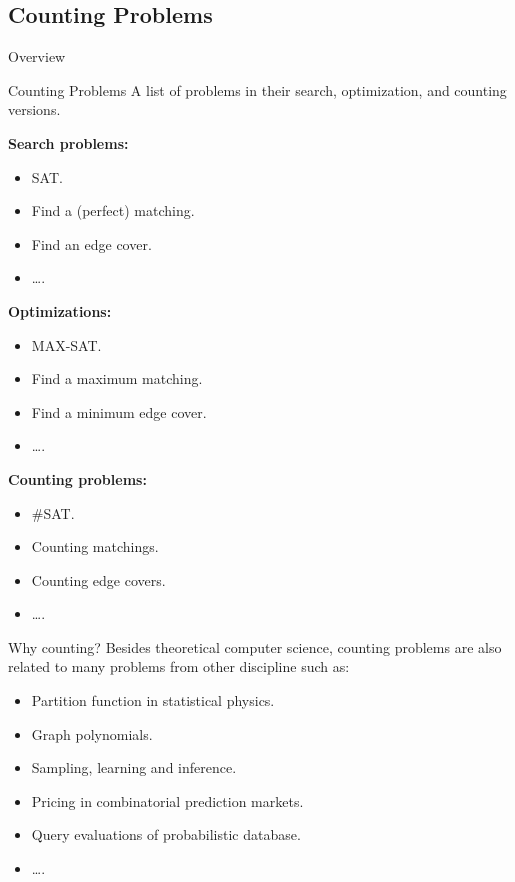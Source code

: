 \documentclass[mathserif]{beamer}
\begin{document}
\subsection{Counting Problems}
\begin{frame}{Overview}
	\tableofcontents[currentsubsection, hideothersubsections, sectionstyle=show/shaded, subsectionstyle=show/shaded]
\end{frame}
\begin{frame}{Counting Problems}
	A list of problems in their search, optimization, and counting versions.
	\bigskip

	\begin{minipage}[tb]{0.3\linewidth}
		{\bf Search problems:}
		\begin{itemize}
			\item SAT.
			\item Find a (perfect) matching.
			\item Find an edge cover.
			\item \dots.
		\end{itemize}
	\end{minipage}
	\pause
	\begin{minipage}[tb]{0.3\linewidth}
		{\bf Optimizations:}
		\begin{itemize}
			\item MAX-SAT.
			\item Find a maximum matching.
			\item Find a minimum edge cover.
			\item \dots.
		\end{itemize}
	\end{minipage}
	\pause
	\begin{minipage}[tb]{0.3\linewidth}
		{\bf Counting problems:}
		\begin{itemize}
			\item \#SAT.
			\item Counting matchings.
			\item\alert{Counting edge covers}.
			\item \dots.
		\end{itemize}
	\end{minipage}
\end{frame}

\begin{frame}{Why counting?}
Besides theoretical computer science, counting problems are also related to many problems from other discipline such as:
\begin{itemize}
	\item Partition function in statistical physics.
		\pause
	\item Graph polynomials.
		\pause
	\item Sampling, learning and inference.
		\pause
    \item Pricing in combinatorial prediction markets.
	\item Query evaluations of probabilistic database.
	\item \dots.
\end{itemize}
\end{frame}
\end{document}
